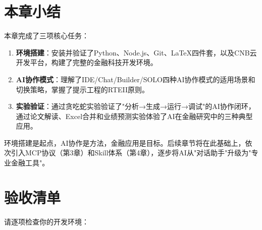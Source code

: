 \section{本章小结}

本章完成了三项核心任务：

\begin{enumerate}[leftmargin=2em]
  \item \textbf{环境搭建}：安装并验证了Python、Node.js、Git、LaTeX四件套，以及CNB云开发平台，构建了完整的金融科技开发环境。
  \item \textbf{AI协作模式}：理解了IDE/Chat/Builder/SOLO四种AI协作模式的适用场景和切换策略，掌握了提示工程的RTEII原则。
  \item \textbf{实验验证}：通过贪吃蛇实验验证了"分析→生成→运行→调试"的AI协作闭环，通过论文解读、Excel合并和业绩预测实验体验了AI在金融研究中的三种典型应用。
\end{enumerate}

\begin{theorybox}[从"会用"到"善用"]
环境搭建是起点，AI协作是方法，金融应用是目标。后续章节将在此基础上，依次引入MCP协议（第3章）和Skill体系（第4章），逐步将AI从"对话助手"升级为"专业金融工具"。
\end{theorybox}

\section{验收清单}

请逐项检查你的开发环境：

